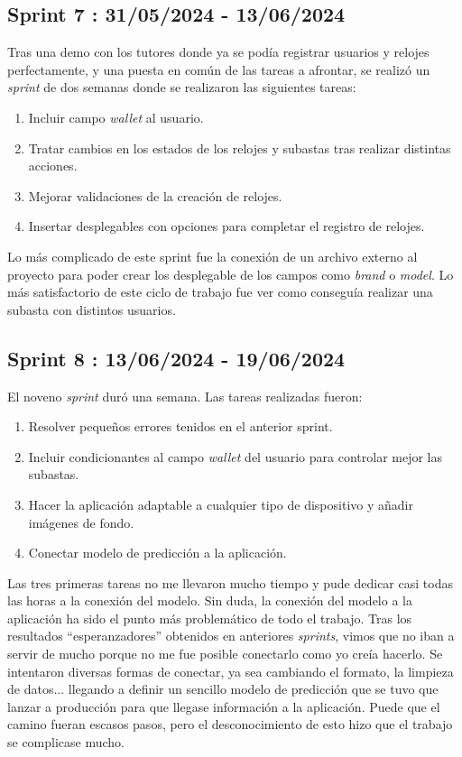 \subsection{Sprint 7 : 31/05/2024 - 13/06/2024}

	Tras una demo con los tutores donde ya se podía registrar usuarios y relojes perfectamente, y una puesta en común de las tareas a afrontar, se realizó un \emph{sprint} de dos semanas donde se realizaron las siguientes tareas:
	\begin{enumerate}
		\item Incluir campo \emph{wallet} al usuario.
		\item Tratar cambios en los estados de los relojes y subastas tras realizar distintas acciones.
		\item Mejorar validaciones de la creación de relojes.
		\item Insertar desplegables con opciones para completar el registro de relojes.
	\end{enumerate}
	Lo más complicado de este sprint fue la conexión de un archivo externo al proyecto para poder crear los desplegable de los campos como \emph{brand} o \emph{model}. Lo más satisfactorio de este ciclo de trabajo fue ver como conseguía realizar una subasta con distintos usuarios.
	
\subsection{Sprint 8 : 13/06/2024 - 19/06/2024}

	El noveno \emph{sprint} duró una semana. Las tareas realizadas fueron:
	\begin{enumerate}
		\item Resolver pequeños errores tenidos en el anterior sprint.
		\item Incluir condicionantes al campo \emph{wallet} del usuario para controlar mejor las subastas.
		\item Hacer la aplicación adaptable a cualquier tipo de dispositivo y añadir imágenes de fondo.
		\item Conectar modelo de predicción a la aplicación.
	\end{enumerate}
	Las tres primeras tareas no me llevaron mucho tiempo y pude dedicar casi todas las horas a la conexión del modelo. Sin duda, la conexión del modelo a la aplicación ha sido el punto más problemático de todo el trabajo. Tras los resultados ``esperanzadores'' obtenidos en anteriores \emph{sprints}, vimos que no iban a servir de mucho porque no me fue posible conectarlo como yo creía hacerlo. Se intentaron diversas formas de conectar, ya sea cambiando el formato, la limpieza de datos... llegando a definir un sencillo modelo de predicción que se tuvo que lanzar a producción para que llegase información a la aplicación. Puede que el camino fueran escasos pasos, pero el desconocimiento de esto hizo que el trabajo se complicase mucho.
	
